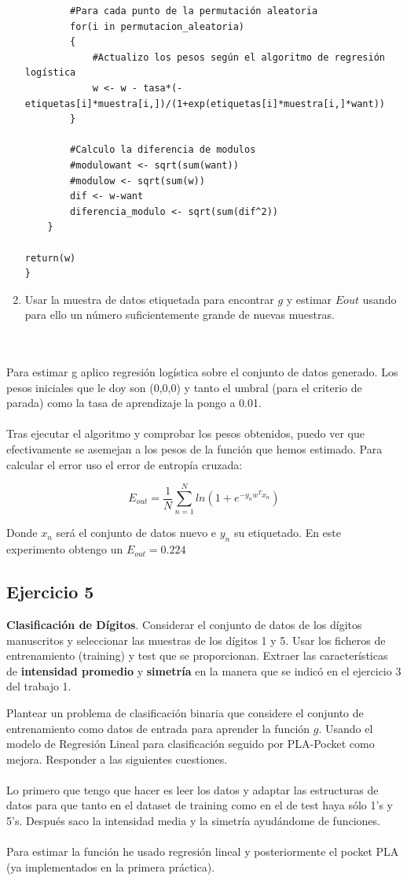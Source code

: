 \begin{enumerate}
\begin{lstlisting}
		#Para cada punto de la permutación aleatoria
		for(i in permutacion_aleatoria)
		{
			#Actualizo los pesos según el algoritmo de regresión logística
			w <- w - tasa*(-etiquetas[i]*muestra[i,])/(1+exp(etiquetas[i]*muestra[i,]*want))
		}
		
		#Calculo la diferencia de modulos
		#modulowant <- sqrt(sum(want))
		#modulow <- sqrt(sum(w))
		dif <- w-want
		diferencia_modulo <- sqrt(sum(dif^2))
	}

return(w)
}
	 	\end{lstlisting}
	 	\item Usar la muestra de datos etiquetada para encontrar $g$ y estimar $Eout$  usando para ello un número suficientemente grande de nuevas muestras. 
	 \end{enumerate}
	 	\\
	 	\\
	 	
	 	Para estimar g aplico regresión logística sobre el conjunto de datos generado. Los pesos iniciales que le doy son (0,0,0) y tanto el umbral (para el criterio de parada) como la tasa de aprendizaje la pongo a 0.01.
	 	\\
	 	\\
	 	
	 	Tras ejecutar el algoritmo y comprobar los pesos obtenidos, puedo ver que efectivamente se asemejan a los pesos de la función que hemos estimado. Para calcular el error uso el error de entropía cruzada:
	 	
	 	$$E_{out}=\frac{1}{N}\sum_{n=1}^{N}ln(1+e^{-y_{n}w^{T}x_{n}})$$
	 		
		Donde $x_n$ será el conjunto de datos nuevo e $y_n$ su etiquetado. En este experimento obtengo un $E_{out}=0.224$

	\subsection{Ejercicio 5}
	\textbf{Clasificación de Dígitos}. Considerar el conjunto de datos de los dígitos manuscritos y seleccionar las muestras de los dígitos 1 y 5. Usar los ficheros de entrenamiento (training) y test que se proporcionan. Extraer las características de {\bf intensidad promedio} y {\bf simetría} en la manera que se indicó en el ejercicio 3 del trabajo 1.
	
	Plantear un problema de clasificación binaria que considere el conjunto de entrenamiento como datos de entrada para aprender la función $g$. Usando el modelo de Regresión Lineal para clasificación seguido por PLA-Pocket como mejora. Responder a las siguientes cuestiones.
	\\
	\\
	Lo primero que tengo que hacer es leer los datos y adaptar las estructuras de datos para que tanto en el dataset de training como en el de test haya sólo 1's y 5's. Después saco la intensidad media y la simetría ayudándome de funciones.
	\\
	\\
	Para estimar la función he usado regresión lineal y posteriormente el pocket PLA (ya implementados en la primera práctica).
	
